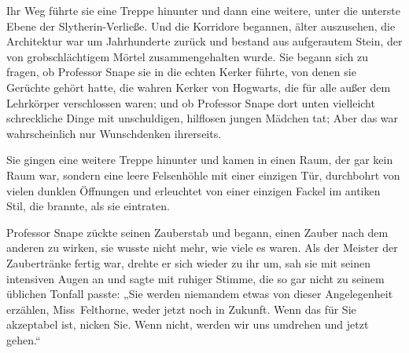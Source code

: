 Ihr Weg führte sie eine Treppe hinunter und dann eine weitere, unter die unterste Ebene der Slytherin-Verließe. Und die Korridore begannen, älter auszusehen, die Architektur war um Jahrhunderte zurück und bestand aus aufgerautem Stein, der von grobschlächtigem Mörtel zusammengehalten wurde. Sie begann sich zu fragen, ob Professor Snape sie in die echten Kerker führte, von denen sie Gerüchte gehört hatte, die wahren Kerker von Hogwarts, die für alle außer dem Lehrkörper verschlossen waren; und ob Professor Snape dort unten vielleicht schreckliche Dinge mit unschuldigen, hilflosen jungen Mädchen tat; Aber das war wahrscheinlich nur Wunschdenken ihrerseits.

Sie gingen eine weitere Treppe hinunter und kamen in einen Raum, der gar kein Raum war, sondern eine leere Felsenhöhle mit einer einzigen Tür, durchbohrt von vielen dunklen Öffnungen und erleuchtet von einer einzigen Fackel im antiken Stil, die brannte, als sie eintraten.

Professor Snape zückte seinen Zauberstab und begann, einen Zauber nach dem anderen zu wirken, sie wusste nicht mehr, wie viele es waren. Als der Meister der Zaubertränke fertig war, drehte er sich wieder zu ihr um, sah sie mit seinen intensiven Augen an und sagte mit ruhiger Stimme, die so gar nicht zu seinem üblichen Tonfall passte: „Sie werden niemandem etwas von dieser Angelegenheit erzählen, Miss~Felthorne, weder jetzt noch in Zukunft. Wenn das für Sie akzeptabel ist, nicken Sie. Wenn nicht, werden wir uns umdrehen und jetzt gehen.“


